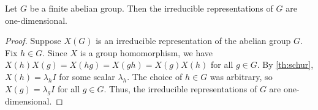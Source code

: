 \begin{corollary}\label{cor:abelian_irred}
    Let $G$ be a finite abelian group. Then the irreducible representations of $G$ are one-dimensional.
\end{corollary}
\begin{proof}
    Suppose $X(G)$ is an irreducible representation of the abelian group $G$. Fix $h\in G$. Since $X$ is a group homomorphism, we have $X(h)X(g)=X(hg)=X(gh)=X(g)X(h)$ for all $g\in G$. By \cref{th:schur}, $X(h) = \lambda_h I$ for some scalar $\lambda_h$. The choice of $h\in G$ was arbitrary, so $X(g) = \lambda_g I$ for all $g\in G$. Thus, the irreducible representations of $G$ are one-dimensional.
\end{proof}